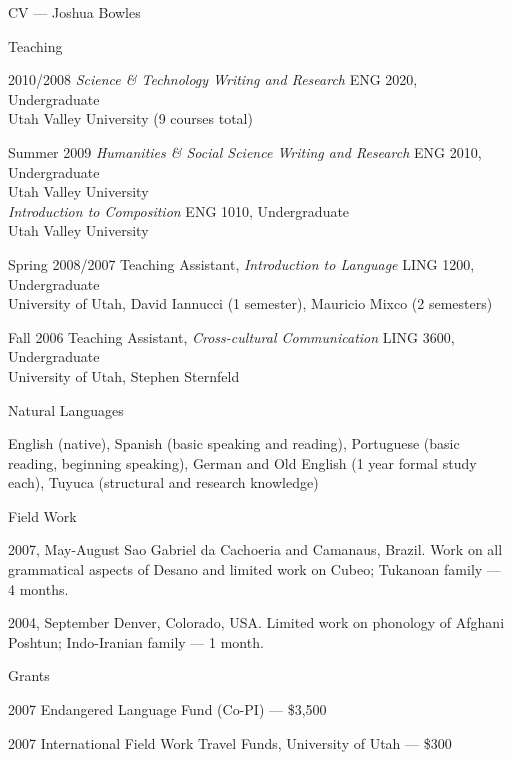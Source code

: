 \begin{cv}{CV --- Joshua Bowles}
\begin{cvlist}{Teaching}

\item[2010/2008]        \emph{Science \& Technology Writing and Research} ENG 2020, Undergraduate\\ 
                           Utah Valley University (9 courses total)
\item[Summer 2009]      \emph{Humanities \& Social Science Writing and Research} ENG 2010, Undergraduate\\
                           Utah Valley University\\
                        \emph{Introduction to Composition} ENG 1010, Undergraduate\\ 
                           Utah Valley University
\item[Spring 2008/2007] Teaching Assistant, \emph{Introduction to Language} LING 1200, Undergraduate\\
                        University of Utah, David Iannucci (1 semester), Mauricio Mixco (2 semesters)
\item[Fall 2006]        Teaching Assistant, \emph{Cross-cultural Communication} LING 3600, Undergraduate\\
                           University of Utah, Stephen Sternfeld                        
\end{cvlist}

\begin{cvlist}{Natural Languages}
\item English (native),  Spanish (basic speaking and reading), Portuguese (basic reading, beginning
speaking), German and Old English (1 year formal study each), Tuyuca (structural and research
knowledge)
\end{cvlist}

\begin{cvlist}{Field Work}
\item[2007, May-August] Sao Gabriel da Cachoeria and Camanaus, Brazil. Work on all grammatical
aspects of Desano and limited work on Cubeo; Tukanoan family --- 4 months. 
\item[2004, September] Denver, Colorado, USA. Limited work on phonology of Afghani Poshtun;
Indo-Iranian family --- 1 month.
\end{cvlist}

\begin{cvlist}{Grants}
\item[2007] Endangered Language Fund (Co-PI) --- \$3,500  
\item[2007] International Field Work Travel Funds, University of Utah --- \$300
\end{cvlist}


\end{cv}
